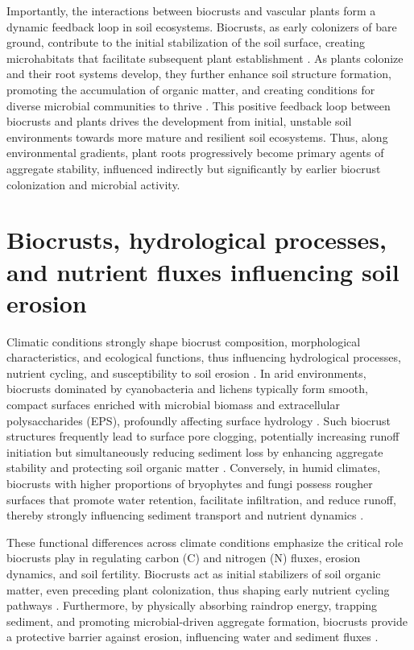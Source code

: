 Importantly, the interactions between biocrusts and vascular plants form a dynamic feedback loop in soil ecosystems. Biocrusts, as early colonizers of bare ground, contribute to the initial stabilization of the soil surface, creating microhabitats that facilitate subsequent plant establishment \citep{BelnapBüdel2016,Bowker2006}. As plants colonize and their root systems develop, they further enhance soil structure formation, promoting the accumulation of organic matter, and creating conditions for diverse microbial communities to thrive \citep{Schweizer2018,Six2004}. This positive feedback loop between biocrusts and plants drives the development from initial, unstable soil environments towards more mature and resilient soil ecosystems. Thus, along environmental gradients, plant roots progressively become primary agents of aggregate stability, influenced indirectly but significantly by earlier biocrust colonization and microbial activity.

\section{Biocrusts, hydrological processes, and nutrient fluxes influencing soil erosion}
\label{sec:BiocrustFluxes}

Climatic conditions strongly shape biocrust composition, morphological characteristics, and ecological functions, thus influencing hydrological processes, nutrient cycling, and susceptibility to soil erosion \citep{Belnap2003,ConcostrinaZubiri2014}. In arid environments, biocrusts dominated by cyanobacteria and lichens typically form smooth, compact surfaces enriched with microbial biomass and extracellular polysaccharides (EPS), profoundly affecting surface hydrology \citep{RodriguezCaballero2018,Weber2022}. Such biocrust structures frequently lead to surface pore clogging, potentially increasing runoff initiation but simultaneously reducing sediment loss by enhancing aggregate stability and protecting soil organic matter \citep{Kidron2021}. Conversely, in humid climates, biocrusts with higher proportions of bryophytes and fungi possess rougher surfaces that promote water retention, facilitate infiltration, and reduce runoff, thereby strongly influencing sediment transport and nutrient dynamics \citep{RiverasMuñoz2022,Seitz2017}.

These functional differences across climate conditions emphasize the critical role biocrusts play in regulating carbon (C) and nitrogen (N) fluxes, erosion dynamics, and soil fertility. Biocrusts act as initial stabilizers of soil organic matter, even preceding plant colonization, thus shaping early nutrient cycling pathways \citep{Belnap2007,Young2022}. Furthermore, by physically absorbing raindrop energy, trapping sediment, and promoting microbial-driven aggregate formation, biocrusts provide a protective barrier against erosion, influencing water and sediment fluxes \cite{Costa2018,Xiao2022}.

